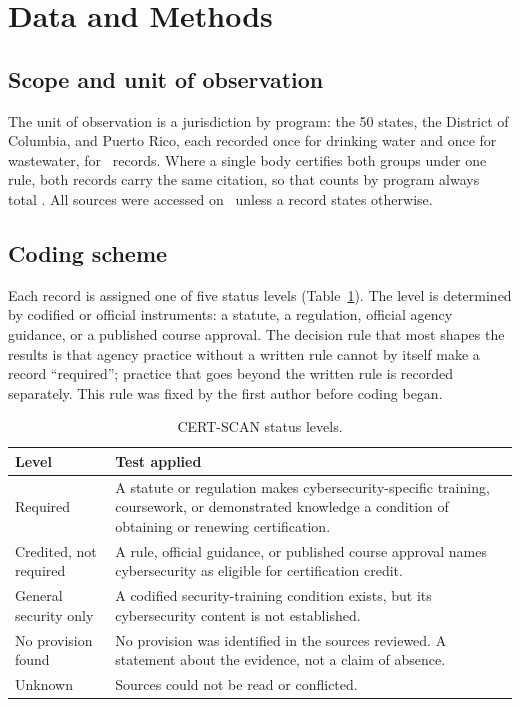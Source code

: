 \documentclass[10pt,twocolumn,letterpaper]{article}
\begin{document}
\section{Data and Methods}\label{sec:methods}

\subsection{Scope and unit of observation}

The unit of observation is a jurisdiction by program: the 50 states, the District of Columbia, and Puerto Rico, each recorded once for drinking water and once for wastewater, for \nRows\ records. Where a single body certifies both groups under one rule, both records carry the same citation, so that counts by program always total \nJuris. All sources were accessed on \accessDate\ unless a record states otherwise.

\subsection{Coding scheme}

Each record is assigned one of five status levels (Table~\ref{tab:scheme}). The level is determined by codified or official instruments: a statute, a regulation, official agency guidance, or a published course approval. The decision rule that most shapes the results is that agency practice without a written rule cannot by itself make a record ``required''; practice that goes beyond the written rule is recorded separately. This rule was fixed by the first author before coding began.

\begin{table}[t]
\caption{CERT-SCAN status levels.}\label{tab:scheme}
\small\centering
\begin{tabularx}{\columnwidth}{@{}>{\raggedright\arraybackslash}p{}>{\raggedright\arraybackslash}X@{}}
\toprule\toprule
Level & Test applied \\
\midrule
Required & A statute or regulation makes cybersecurity-specific training, coursework, or demonstrated knowledge a condition of obtaining or renewing certification. \\
Credited, not required & A rule, official guidance, or published course approval names cybersecurity as eligible for certification credit. \\
General security only & A codified security-training condition exists, but its cybersecurity content is not established. \\
No provision found & No provision was identified in the sources reviewed. A statement about the evidence, not a claim of absence. \\
Unknown & Sources could not be read or conflicted. \\
\bottomrule
\end{tabularx}
\end{table}
\end{document}
